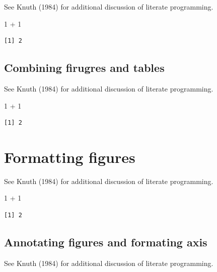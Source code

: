 \documentclass[
  letterpaper,
  DIV=11,
  numbers=noendperiod]{scrreprt}
\newenvironment{Shaded}{\begin{snugshade}}{\end{snugshade}}
\newcommand{\DecValTok}[1]{\textcolor[rgb]{0.68,0.00,0.00}{#1}}
\newcommand{\SpecialCharTok}[1]{\textcolor[rgb]{0.37,0.37,0.37}{#1}}
\begin{document}
See Knuth (1984) for additional discussion of literate programming.

\begin{Shaded}
\begin{Highlighting}[]
\DecValTok{1} \SpecialCharTok{+} \DecValTok{1}
\end{Highlighting}
\end{Shaded}

\begin{verbatim}
[1] 2
\end{verbatim}

\chapter{Combining firugres and
tables}\label{combining-firugres-and-tables}

See Knuth (1984) for additional discussion of literate programming.

\begin{Shaded}
\begin{Highlighting}[]
\DecValTok{1} \SpecialCharTok{+} \DecValTok{1}
\end{Highlighting}
\end{Shaded}

\begin{verbatim}
[1] 2
\end{verbatim}

\part{Formatting figures}

See Knuth (1984) for additional discussion of literate programming.

\begin{Shaded}
\begin{Highlighting}[]
\DecValTok{1} \SpecialCharTok{+} \DecValTok{1}
\end{Highlighting}
\end{Shaded}

\begin{verbatim}
[1] 2
\end{verbatim}

\chapter{Annotating figures and formating
axis}\label{annotating-figures-and-formating-axis}

See Knuth (1984) for additional discussion of literate programming.
\end{document}
